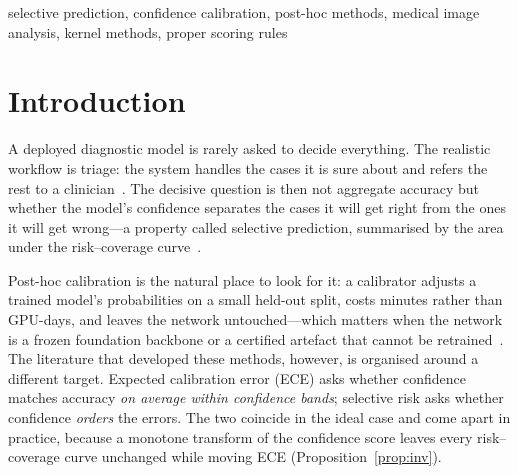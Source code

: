 \documentclass[conference]{IEEEtran}
\begin{document}
\begin{IEEEkeywords}
selective prediction, confidence calibration, post-hoc methods, medical image
analysis, kernel methods, proper scoring rules
\end{IEEEkeywords}

\section{Introduction}

A deployed diagnostic model is rarely asked to decide everything. The realistic
workflow is triage: the system handles the cases it is sure about and refers the
rest to a clinician~\cite{kompa2021second}. The decisive question is then not
aggregate accuracy but whether the model's confidence separates the cases it will
get right from the ones it will get wrong---a property called selective
prediction, summarised by the area under the risk--coverage
curve~\cite{elyaniv2010foundations,geifman2017selective}.

Post-hoc calibration is the natural place to look for it: a calibrator adjusts a
trained model's probabilities on a small held-out split, costs minutes rather than
GPU-days, and leaves the network untouched---which matters when the network is a
frozen foundation backbone or a certified artefact that cannot be
retrained~\cite{guo2017calibration,kull2019beyond}. The literature that developed
these methods, however, is organised around a different target. Expected
calibration error (ECE) asks whether confidence matches accuracy \emph{on average
within confidence bands}; selective risk asks whether confidence \emph{orders} the
errors. The two coincide in the ideal case and come apart in practice, because a
monotone transform of the confidence score leaves every risk--coverage curve
unchanged while moving ECE (Proposition~\ref{prop:inv}).
\end{document}
